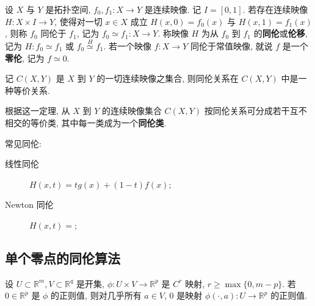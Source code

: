 \begin{definition}
  设 \(X\) 与 \(Y\) 是拓扑空间, \(f_0,f_1:X\to Y\) 是连续映像. 记 \(I=[0,1]\). 若存在连续映像 \(H:X\times I\to Y\), 使得对一切 \(x\in X\) 成立 \(H(x,0)=f_0(x)\) 与 \(H(x,1)=f_1(x)\), 则称 \(f_0\) 同伦于 \(f_1\), 记为 \(f_0\simeq f_1:X\to Y\). 称映像 \(H\) 为从 \(f_0\) 到 \(f_1\) 的\textbf{同伦}或\textbf{伦移}, 记为 \(H:f_0\simeq f_1\) 或 \(f_0 \overset{H}{\simeq} f_1\). 若一个映像 \(f:X\to Y\) 同伦于常值映像, 就说 \(f\) 是一个\textbf{零伦}, 记为 \(f\simeq 0\).
\end{definition}

\begin{theorem}
  记 \(C(X,Y)\) 是 \(X\) 到 \(Y\) 的一切连续映像之集合, 则同伦关系在 \(C(X,Y)\) 中是一种等价关系.
\end{theorem}

根据这一定理, 从 \(X\) 到 \(Y\) 的连续映像集合 \(C(X,Y)\) 按同伦关系可分成若干互不相交的等价类, 其中每一类成为一个\textbf{同伦类}.

常见同伦:
\begin{description}
  \item[线性同伦] \(H(x,t)=tg(x)+(1-t)f(x)\);
  \item[Newton 同伦] \(H(x,t)=\);
\end{description}

\subsection{单个零点的同伦算法}

\begin{theorem}
  设 \(U\subset\mathbb{R}^m,V\subset\mathbb{R}^q\) 是开集, \(\phi:U\times V\to\mathbb{R}^p\) 是 \(C^r\) 映射, \(r\ge\max\lbrace 0,m-p\rbrace\). 若 \(0\in\mathbb{R}^p\) 是 \(\phi\) 的正则值, 则对几乎所有 \(a\in V\), \(0\) 是映射 \(\phi(\cdot,a):U\to\mathbb{R}^p\) 的正则值.
\end{theorem}
